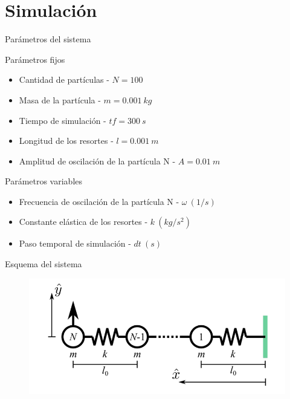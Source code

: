 \section{Simulación}\label{sec:simulacion}

\begin{frame}{Parámetros del sistema}
    \begin{block}{Parámetros fijos}
        \begin{itemize}
            \item Cantidad de partículas - $N = 100$
            \item Masa de la partícula - $m = 0.001\ kg$
            \item Tiempo de simulación - $tf = 300\ s$
            \item Longitud de los resortes - $l = 0.001\ m$
            \item Amplitud de oscilación de la partícula N - $A = 0.01\ m$
        \end{itemize}
    \end{block}
    \begin{block}{Parámetros variables}
        \begin{itemize}
            \item Frecuencia de oscilación de la partícula N - $\omega\ (1/s)$
            \item Constante elástica de los resortes - $k\ (kg/s^2)$
            \item Paso temporal de simulación - $dt\ (s)$
        \end{itemize}
    \end{block}
\end{frame}

\begin{frame}{Esquema del sistema}
    \begin{figure}[H]
        \centering
        \includegraphics[width=0.8\linewidth]{pic/04-sim/system-schema}\label{fig:figure-system-schema}
    \end{figure}
\end{frame}

